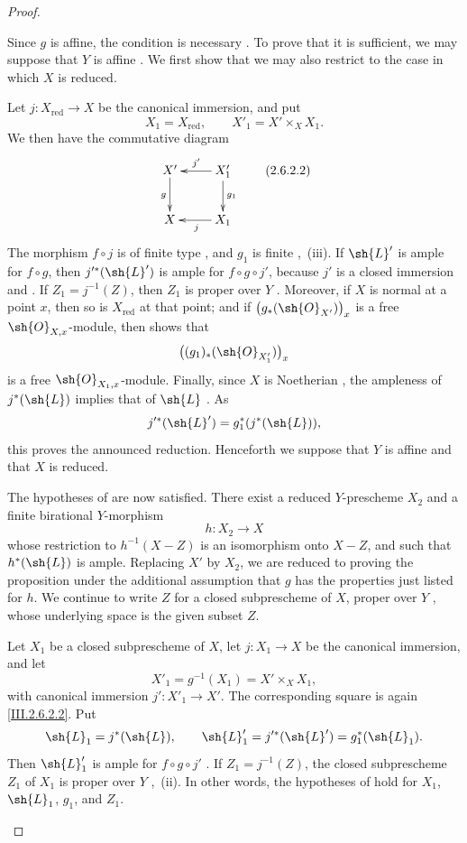 \begin{proof}
\begin{env}[2.6.2.1]
\label{III.2.6.2.1}
Since $g$ is affine, the condition is necessary .
To prove that it is sufficient, we may suppose that $Y$ is affine
.
We first show that we may also restrict to the case in which $X$ is
reduced.

Let $j:X_{\mathrm{red}}\to X$ be the canonical immersion, and put
\[
  X_1=X_{\mathrm{red}},
  \qquad
  X'_1=X'\times_X X_1.
\]
We then have the commutative diagram
\[
  \xymatrix{
    X'\ar[d]_g &
    X'_1\ar[l]_{j'}\ar[d]^{g_1}\\
    X &
    X_1\ar[l]^{j}
  }
  \label{III.2.6.2.2}\tag{2.6.2.2}
\]
The morphism $f\circ j$ is of finite type , and
$g_1$ is finite ,~(iii).
If $\sh{L}'$ is ample for $f\circ g$, then
$j'^*(\sh{L}')$ is ample for $f\circ g\circ j'$, because $j'$ is a
closed immersion  and .
If $Z_1=j^{-1}(Z)$, then $Z_1$ is proper over $Y$
.
Moreover, if $X$ is normal at a point $x$, then so is $X_{\mathrm{red}}$
at that point; and if
$\bigl(g_*(\sh{O}_{X'})\bigr)_x$ is a free $\sh{O}_{X,x}$-module,
then  shows that
\[
  \bigl((g_1)_*(\sh{O}_{X'_1})\bigr)_x
\]
is a free $\sh{O}_{X_1,x}$-module.
Finally, since $X$ is Noetherian , the ampleness of
$j^*(\sh{L})$ implies that of $\sh{L}$ .
As
\[
  j'^*(\sh{L}')=g_1^*(j^*(\sh{L})),
\]
this proves the announced reduction.
Henceforth we suppose that $Y$ is affine and that $X$ is reduced.
\end{env}

The hypotheses of  are now satisfied.
There exist a reduced $Y$-prescheme $X_2$ and a finite birational
$Y$-morphism
\[
  h:X_2\to X
\]
whose restriction to $h^{-1}(X-Z)$ is an isomorphism onto $X-Z$, and
such that $h^*(\sh{L})$ is ample.
Replacing $X'$ by $X_2$, we are reduced to proving the proposition under
the additional assumption that $g$ has the properties just listed for
$h$.
We continue to write $Z$ for a closed subprescheme of $X$, proper over
$Y$ , whose underlying space is the given subset
$Z$.

\begin{env}[2.6.2.3]
\label{III.2.6.2.3}
Let $X_1$ be a closed subprescheme of $X$, let $j:X_1\to X$ be the
canonical immersion, and let
\[
  X'_1=g^{-1}(X_1)=X'\times_X X_1,
\]
with canonical immersion $j':X'_1\to X'$.
The corresponding square is again \eqref{III.2.6.2.2}.
Put
\[
  \sh{L}_1=j^*(\sh{L}),
  \qquad
  \sh{L}'_1=j'^*(\sh{L}')=g_1^*(\sh{L}_1).
\]
Then $\sh{L}'_1$ is ample for $f\circ g\circ j'$
.
If $Z_1=j^{-1}(Z)$, the closed subprescheme $Z_1$ of $X_1$ is proper
over $Y$ ,~(ii).
In other words, the hypotheses of  hold for
$X_1$, $\sh{L}_1$, $g_1$, and $Z_1$.
\end{env}


\end{proof}
